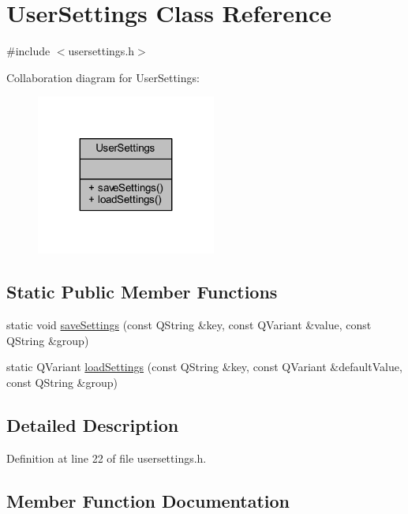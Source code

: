 \hypertarget{class_user_settings}{}\section{User\+Settings Class Reference}
\label{class_user_settings}


{\ttfamily \#include $<$usersettings.\+h$>$}



Collaboration diagram for User\+Settings\+:\nopagebreak
\begin{figure}[H]
\begin{center}
\leavevmode
\includegraphics[width=167pt]{class_user_settings__coll__graph}
\end{center}
\end{figure}
\subsection*{Static Public Member Functions}
\begin{DoxyCompactItemize}
\item 
static void \mbox{\hyperlink{class_user_settings_a0ec1a38cad81b92041d4024a4862c738}{save\+Settings}} (const Q\+String \&key, const Q\+Variant \&value, const Q\+String \&group)
\item 
static Q\+Variant \mbox{\hyperlink{class_user_settings_aa58768206ee548c32bf5f89e1ed8c8ba}{load\+Settings}} (const Q\+String \&key, const Q\+Variant \&default\+Value, const Q\+String \&group)
\end{DoxyCompactItemize}


\subsection{Detailed Description}


Definition at line 22 of file usersettings.\+h.



\subsection{Member Function Documentation}
\mbox{\label{class_user_settings_aa58768206ee548c32bf5f89e1ed8c8ba}} 
